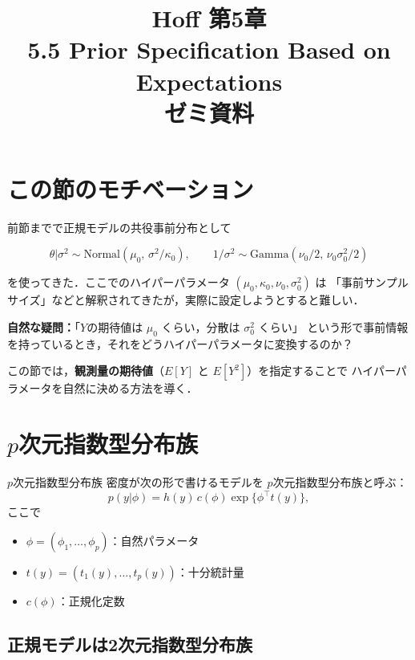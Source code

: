 \documentclass[lualatex,ja=standard,a4paper,12pt]{bxjsarticle}
\title{{\large Hoff 第5章} \\[6pt]
       \textbf{5.5\; Prior Specification Based on Expectations} \\[4pt]
       {\normalsize ゼミ資料}}
\author{}
\date{}
\begin{document}
\maketitle
\thispagestyle{empty}

\section{この節のモチベーション}

前節までで正規モデルの共役事前分布として

\[
  \theta|\sigma^2 \sim \mathrm{Normal}(\mu_0,\, \sigma^2/\kappa_0),
  \qquad
  1/\sigma^2 \sim \mathrm{Gamma}(\nu_0/2,\, \nu_0\sigma_0^2/2)
\]

を使ってきた．ここでのハイパーパラメータ $(\mu_0, \kappa_0, \nu_0, \sigma_0^2)$ は
「事前サンプルサイズ」などと解釈されてきたが，実際に設定しようとすると難しい．

\medskip
\noindent
\textbf{自然な疑問：}「$Y$の期待値は $\mu_0$ くらい，分散は $\sigma_0^2$ くらい」
という形で事前情報を持っているとき，それをどうハイパーパラメータに変換するのか？

\medskip
\noindent
この節では，\textbf{観測量の期待値}（$E[Y]$ と $E[Y^2]$）を指定することで
ハイパーパラメータを自然に決める方法を導く．

\section{$p$次元指数型分布族}

\begin{defbox}{$p$次元指数型分布族}
密度が次の形で書けるモデルを $p$次元指数型分布族と呼ぶ：
\[
  p(y|\phi) = h(y)\,c(\phi)\exp\!\bigl\{\phi^\top t(y)\bigr\},
\]
ここで
\begin{itemize}
  \item $\phi = (\phi_1, \ldots, \phi_p)$：自然パラメータ
  \item $t(y) = (t_1(y), \ldots, t_p(y))$：十分統計量
  \item $c(\phi)$：正規化定数
\end{itemize}
\end{defbox}

\subsection*{正規モデルは2次元指数型分布族}
\end{document}
